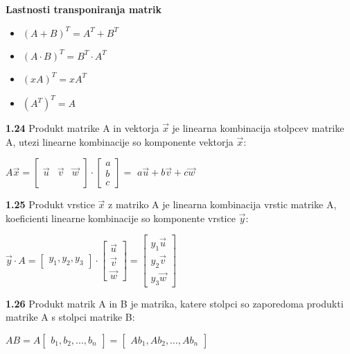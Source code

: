 \documentclass{article}
\begin{document}
\begin{multicols}{4}
\textbf{Lastnosti transponiranja matrik}
\begin{itemize}
    \item $(A + B)^{T} = A^{T} + B^{T}$
    \item $(A \cdot B)^{T} = B^{T} \cdot A^{T}$
    \item $(xA)^{T} = xA^{T}$
    \item $(A^{T})^{T} = A$
\end{itemize}

\textbf{1.24} Produkt matrike A in vektorja $\vec{x}$ je
linearna kombinacija stolpcev matrike A, utezi linearne
kombinacije so komponente vektorja $\vec{x}$:
\begin{center}
    $A \vec{x} =
    \begin{bmatrix}
                &         & \\
        \vec{u} & \vec{v} & \vec{w} \\
                &         & \\
    \end{bmatrix}
    \cdot
    \begin{bmatrix}
        a\\
        b\\
        c
    \end{bmatrix} =$
    $a\vec{u} + b\vec{v} + c\vec{w}$
\end{center}

\textbf{1.25} Produkt vrstice $\vec{x}$ z matriko A je
linearna kombinacija vrstic matrike A, koeficienti linearne
kombinacije so komponente vrstice $\vec{y}$:
\begin{center}
    $\vec{y} \cdot A =
    \begin{bmatrix}
        y_{1}, y_{2}, y_{3}
    \end{bmatrix} \cdot
    \begin{bmatrix}
        \vec{u}\\
        \vec{v}\\
        \vec{w}
    \end{bmatrix} =
    \begin{bmatrix}
        y_{1}\vec{u}\\
        y_{2}\vec{v}\\
        y_{3}\vec{w}
    \end{bmatrix}
    $
\end{center}

\textbf{1.26} Produkt matrik A in B je matrika, katere stolpci
so zaporedoma produkti matrike A s stolpci matrike B:
\begin{center}
    $AB = A
    \begin{bmatrix}
        b_{1}, b_{2}, \dots ,b_{n}
    \end{bmatrix} =
    \begin{bmatrix}
        Ab_{1}, Ab_{2}, \dots ,Ab_{n}
    \end{bmatrix}
    $
\end{center}


\end{multicols}
\end{document}
